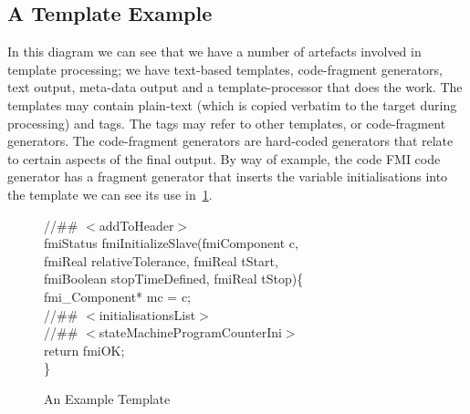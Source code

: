 \documentclass{llncs}%
\begin{document}
\subsection{A Template Example}
In this diagram we can see that we have a number of artefacts involved in template processing; we have text-based templates, code-fragment generators, text output, meta-data output and a template-processor that does the work. The templates may contain plain-text (which is copied verbatim to the target during processing) and tags. The tags may refer to other templates, or code-fragment generators. The code-fragment generators are hard-coded generators that relate to certain aspects of the final output. By way of example, the code FMI code generator has a fragment generator that inserts the variable initialisations into the template we can see its use in~\ref{fig:templateExample}. 
%
\begin{figure}
\begin{center}
\begin{minipage}{0.8\textwidth}
//\#\# $<$addToHeader$>$\\
fmiStatus fmiInitializeSlave(fmiComponent c,\\
\hspace*{0.2cm}fmiReal relativeTolerance, fmiReal tStart,\\
\hspace*{0.2cm}fmiBoolean stopTimeDefined, fmiReal tStop)\{\\
\hspace*{0.4cm}fmi\_Component* mc = c;\\
\hspace*{0.4cm}//\#\# $<$initialisationsList$>$\\
\hspace*{0.4cm}//\#\# $<$stateMachineProgramCounterIni$>$\\
\hspace*{0.4cm}return fmiOK;\\
\}
\end{minipage}
\end{center}
\caption{An Example Template}
\label{fig:templateExample}
\end{figure}
%
%
\end{document}
